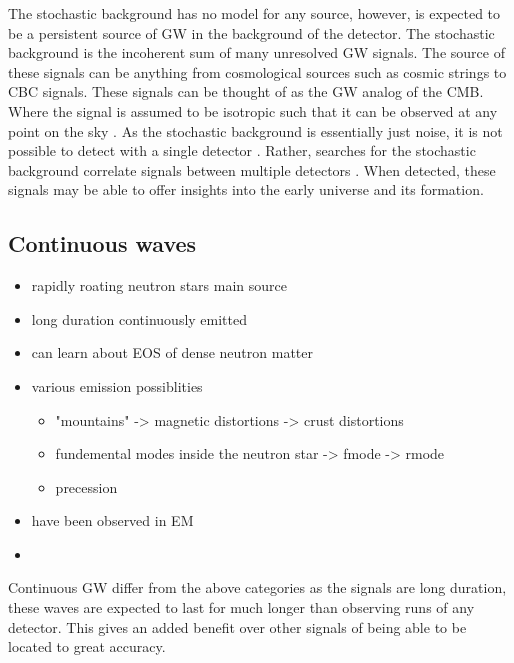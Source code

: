 The stochastic background has no model for any source, however, is expected to be a persistent source of \ac{GW} in the background of the detector. 
The stochastic background is the incoherent sum of many unresolved \ac{GW} signals.
The source of these signals can be anything from cosmological sources such as cosmic strings to \ac{CBC} signals.
These signals can be thought of as the \ac{GW} analog of the \ac{CMB}.
Where the signal is assumed to be isotropic such that it can be observed at any point on the sky \cite{Christensen2018StochasticBackgrounds}. 
As the stochastic background is essentially just noise, it is not possible to detect with a single detector \cite{Christensen2018StochasticBackgrounds}.
Rather, searches for the stochastic background correlate signals between multiple detectors \cite{Romano2019SearchesBackgrounds,Christensen2018StochasticBackgrounds}. 
When detected, these signals may be able to offer insights into the early universe and its formation.



\subsection{Continuous waves}

\begin{itemize}
    \item rapidly roating neutron stars main source
    \item long duration continuously emitted
    \item can learn about EOS of dense neutron matter
    \item various emission possiblities
    \begin{itemize}
        \item "mountains" -> magnetic distortions -> crust distortions
        \item fundemental modes inside the neutron star -> fmode -> rmode
        \item precession
    \end{itemize}
    \item have been observed in EM
    \item 
\end{itemize}

Continuous \ac{GW} differ from the above categories as the signals are long duration, these waves are expected to last for much longer than observing runs of any detector. 
This gives an added benefit over other signals of being able to be located to great accuracy.

